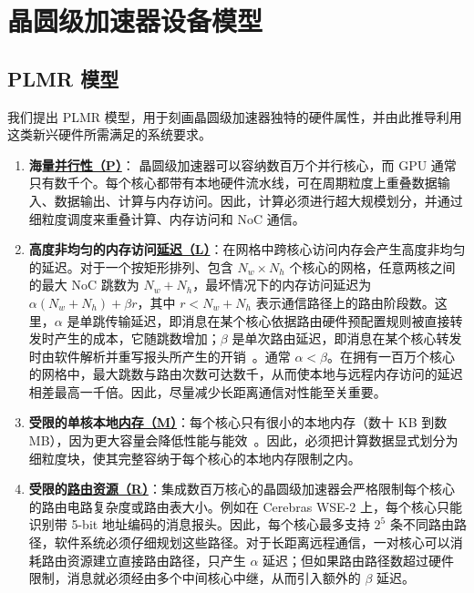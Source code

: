 \vspace{-0.3cm}
\section{晶圆级加速器设备模型}
\vspace{-0.2cm}

\subsection{PLMR 模型}
\vspace{-0.1cm}
我们提出 PLMR 模型，用于刻画晶圆级加速器独特的硬件属性，并由此推导利用这类新兴硬件所需满足的系统要求。

\begin{enumerate}[label=(\arabic*),leftmargin=0.5cm,noitemsep,topsep=0pt]
\item \textbf{海量\underline{并行性（P）}}：
晶圆级加速器可以容纳数百万个并行核心，而 GPU 通常只有数千个。每个核心都带有本地硬件流水线，可在周期粒度上重叠数据输入、数据输出、计算与内存访问。因此，计算必须进行超大规模划分，并通过细粒度调度来重叠计算、内存访问和 NoC 通信。

\item \textbf{高度非均匀的内存访问\underline{延迟（L）}}：在网格中跨核心访问内存会产生高度非均匀的延迟。对于一个按矩形排列、包含 $N_w \times N_h$ 个核心的网格，任意两核之间的最大 NoC 跳数为 $N_w+N_h$，最坏情况下的内存访问延迟为 $\alpha(N_w+N_h)+\beta r$，其中 $r<N_w+N_h$ 表示通信路径上的路由阶段数。这里，$\alpha$ 是单跳传输延迟，即消息在某个核心依据路由硬件预配置规则被直接转发时产生的成本，它随跳数增加；$\beta$ 是单次路由延迟，即消息在某个核心转发时由软件解析并重写报头所产生的开销~\cite{wafer-reduce}。通常 $\alpha<\beta$。在拥有一百万个核心的网格中，最大跳数与路由次数可达数千，从而使本地与远程内存访问的延迟相差最高一千倍。因此，尽量减少长距离通信对性能至关重要。

\item \textbf{受限的单核本地\underline{内存（M）}}：每个核心只有很小的本地内存（数十 KB 到数 MB），因为更大容量会降低性能与能效~\cite{sram-wiki}。因此，必须把计算数据显式划分为细粒度块，使其完整容纳于每个核心的本地内存限制之内。

\item \textbf{受限的\underline{路由资源（R）}}：集成数百万核心的晶圆级加速器会严格限制每个核心的路由电路复杂度或路由表大小。例如在 Cerebras WSE-2 上，每个核心只能识别带 5-bit 地址编码的消息报头。因此，每个核心最多支持 $2^5$ 条不同路由路径，软件系统必须仔细规划这些路径。对于长距离远程通信，一对核心可以消耗路由资源建立直接路由路径，只产生 $\alpha$ 延迟；但如果路由路径数超过硬件限制，消息就必须经由多个中间核心中继，从而引入额外的 $\beta$ 延迟。
\end{enumerate}

